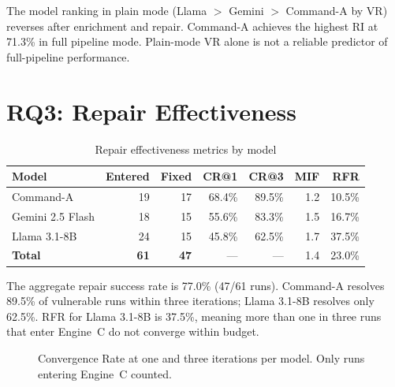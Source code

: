 \documentclass[12pt,a4paper]{report}
\begin{document}
The model ranking in plain mode (Llama $>$ Gemini $>$ Command-A by VR) reverses
after enrichment and repair. Command-A achieves the highest RI at 71.3\% in full
pipeline mode. Plain-mode VR alone is not a reliable predictor of full-pipeline
performance.

\section{RQ3: Repair Effectiveness}
\label{sec:rq3}

\begin{table}[H]
\centering
\caption{Repair effectiveness metrics by model}
\label{tab:repair}
\renewcommand{\arraystretch}{1.3}
\begin{tabular}{@{}lrrrrrr@{}}
\toprule
\textbf{Model} & \textbf{Entered} & \textbf{Fixed}
               & \textbf{CR@1} & \textbf{CR@3} & \textbf{MIF} & \textbf{RFR} \\
\midrule
Command-A         & 19 & 17 & 68.4\% & 89.5\% & 1.2 & 10.5\% \\
Gemini 2.5 Flash  & 18 & 15 & 55.6\% & 83.3\% & 1.5 & 16.7\% \\
Llama 3.1-8B      & 24 & 15 & 45.8\% & 62.5\% & 1.7 & 37.5\% \\
\midrule
\textbf{Total}    & \textbf{61} & \textbf{47} & --- & --- & 1.4 & 23.0\% \\
\bottomrule
\end{tabular}
\end{table}

The aggregate repair success rate is 77.0\% (47/61 runs). Command-A resolves 89.5\%
of vulnerable runs within three iterations; Llama 3.1-8B resolves only 62.5\%.
RFR for Llama 3.1-8B is 37.5\%, meaning more than one in three runs that enter
Engine~C do not converge within budget.

\begin{figure}[H]
\centering
{}
\caption{Convergence Rate at one and three iterations per model.
         Only runs entering Engine~C counted.}
\label{fig:cr_chart}
\end{figure}
\end{document}
